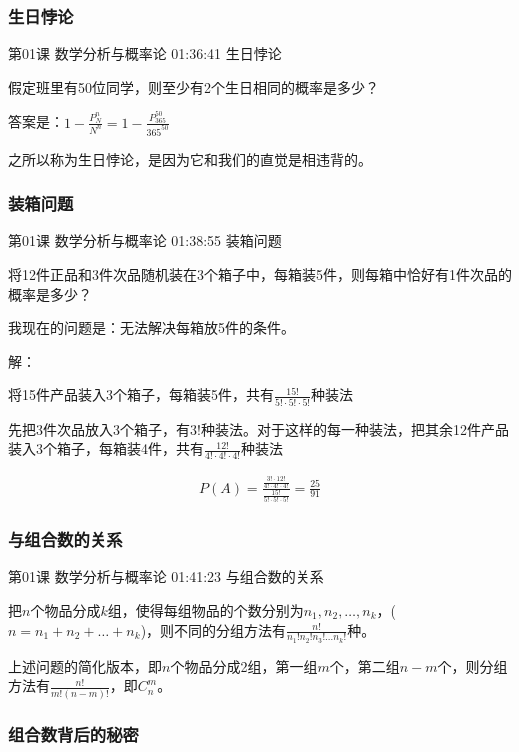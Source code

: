 \documentclass[UTF8]{ctexbook}
\begin{document}
\subsubsection{生日悖论}

第01课 数学分析与概率论 01:36:41 生日悖论

假定班里有50位同学，则至少有2个生日相同的概率是多少？

答案是：$1-\frac{P_{N}^{n}}{N^{n}}=1-\frac{P_{365}^{50}}{365^{50}}$

之所以称为生日悖论，是因为它和我们的直觉是相违背的。

\subsubsection{装箱问题}

第01课 数学分析与概率论 01:38:55 装箱问题

将12件正品和3件次品随机装在3个箱子中，每箱装5件，则每箱中恰好有1件次品的概率是多少？

我现在的问题是：无法解决每箱放5件的条件。

解：

将15件产品装入3个箱子，每箱装5件，共有$\frac{15!}{5!\cdot5!\cdot5!}$种装法

先把3件次品放入3个箱子，有$3!$种装法。对于这样的每一种装法，把其余12件产品装入3个箱子，每箱装4件，共有$\frac{12!}{4!\cdot4!\cdot4!}$种装法

\begin{equation}
\begin{aligned}
P(A)=\frac{\frac{3!\cdot12!}{4!\cdot4!\cdot4!}}{\frac{15!}{5!\cdot5!\cdot5!}}=\frac{25}{91}
\end{aligned}
\end{equation}

\subsubsection{与组合数的关系}

第01课 数学分析与概率论 01:41:23 与组合数的关系

把$n$个物品分成$k$组，使得每组物品的个数分别为$n_{1},n_{2},\dots,n_{k}$，($n=n_{1}+n_{2}+\dots+n_{k}$)，则不同的分组方法有$\frac{n!}{n_{1}!n_{2}!n_{3}!\dots n_{k}!}$种。

上述问题的简化版本，即$n$个物品分成2组，第一组$m$个，第二组$n-m$个，则分组方法有$\frac{n!}{m!(n-m)!}$，即$C_{n}^{m}$。

\subsubsection{组合数背后的秘密}
\end{document}
